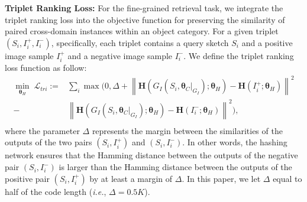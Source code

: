 \documentclass[runningheads]{llncs}
\begin{document}
\noindent\textbf{Triplet Ranking Loss:} For the fine-grained retrieval task, we integrate the triplet ranking loss into the objective function for preserving the similarity of paired cross-domain instances within an object category. For a given triplet $\left(S_i,I_i^+,I_i^-\right)$, specifically, each triplet contains a query sketch $S_i$ and a positive image sample $I_i^+$ and a negative image sample $I_i^-$. 
We define the triplet ranking loss function as follow:
\begin{equation}\label{eq:equiv6}
\begin{split}
\min_{\bm{\theta}_H}\;\mathcal{L}_{tri} := &\sum_{i} \max\big( 0, \Delta +\left \| \mathbf{H}\left ( G_I\left ( S_i, \bm{\theta}_C|_{G_I} \right );\bm{\theta}_H \right ) - \mathbf{H}\left ( I_i^+;\bm{\theta}_H \right ) \right \|^2\\
-&\left \|  \mathbf{H}\left ( G_I\left ( S_i, \bm{\theta}_C|_{G_I} \right );\bm{\theta}_H \right ) - \mathbf{H}\left ( I_i^-;\bm{\theta}_H \right )\right \|^2 \big),\\
\end{split}
\end{equation}
where the parameter $\Delta$ represents the margin between the similarities of the outputs of the two pairs $(S_i, I_i^+)$ and $(S_i, I_i^-)$. In other words, the hashing network ensures that the Hamming distance between the outputs of the negative pair $(S_i, I_i^-)$ is larger than the Hamming distance between the outputs of the positive pair $(S_i, I_i^+)$ by at least a  margin of $\Delta$. In this paper, we let $\Delta$ equal to half of the code length (\textit{i.e.}, $\Delta=0.5K$).
\end{document}

